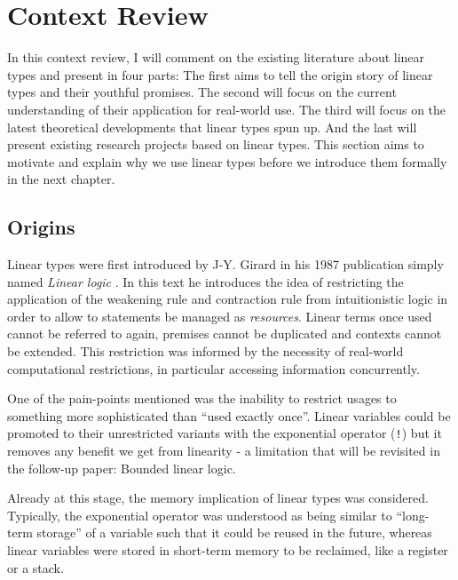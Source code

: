 \documentclass[
]{article}
\begin{document}
\newpage

\hypertarget{context-review}{%
\section{Context Review}\label{context-review}}

In this context review, I will comment on the existing literature about
linear types and present in four parts: The first aims to tell the
origin story of linear types and their youthful promises. The second
will focus on the current understanding of their application for
real-world use. The third will focus on the latest theoretical
developments that linear types spun up. And the last will present
existing research projects based on linear types. This section aims to
motivate and explain why we use linear types before we introduce them
formally in the next chapter.

\hypertarget{origins}{%
\subsection{Origins}\label{origins}}

Linear types were first introduced by J-Y. Girard in his
1987\cite{linear-logic} publication simply named \emph{Linear logic} .
In this text he introduces the idea of restricting the application of
the weakening rule and contraction rule from intuitionistic logic in
order to allow to statements be managed as \emph{resources}. Linear
terms once used cannot be referred to again, premises cannot be
duplicated and contexts cannot be extended. This restriction was
informed by the necessity of real-world computational restrictions, in
particular accessing information concurrently.

One of the pain-points mentioned was the inability to restrict usages to
something more sophisticated than ``used exactly once''. Linear
variables could be promoted to their unrestricted variants with the
exponential operator (\texttt{!}) but it removes any benefit we get from
linearity - a limitation that will be revisited in the follow-up paper:
Bounded linear logic.

Already at this stage, the memory implication of linear types was
considered. Typically, the exponential operator was understood as being
similar to ``long-term storage'' of a variable such that it could be
reused in the future, whereas linear variables were stored in short-term
memory to be reclaimed, like a register or a stack.
\end{document}
